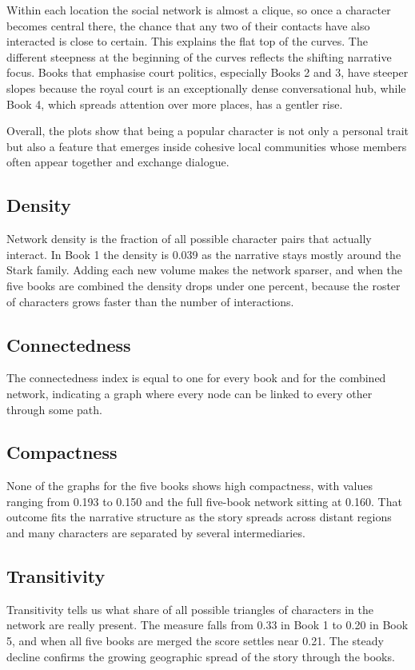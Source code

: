 \documentclass[12pt, a4paper]{article}
\begin{document}
 Within each location the social network is almost a clique, 
 so once a character becomes central there, the chance that any 
 two of their contacts have also interacted is close to certain. 
 This explains the flat top of the curves.
   The different steepness at the beginning of the curves reflects the shifting narrative focus.
   Books that emphasise court politics, especially Books 2 and 3, 
   have steeper slopes because the royal court is an exceptionally 
   dense conversational hub, while Book 4, which spreads attention over more places, 
   has a gentler rise. 
   
   Overall, the plots show that being a popular character is not only a personal trait but also a feature that emerges inside cohesive local communities whose members often appear together and exchange dialogue.

\subsection*{Density}
Network density is the fraction of all possible character pairs that actually interact. In Book 1 the density is 0.039 as the narrative stays mostly around the Stark family. Adding each new volume makes the network sparser, and when the five books are combined the density drops under one percent, because the roster of characters grows faster than the number of interactions.

\subsection*{Connectedness}
The connectedness index is equal to one for every book and for the combined network, indicating a graph where every node can be linked to every other through some path. 

\subsection*{Compactness}
None of the graphs for the five books shows high compactness, with values ranging from 0.193 to 0.150 and the full five-book network sitting at 0.160. That outcome fits the narrative structure as the story spreads across distant regions and many characters are separated by several intermediaries. 

\subsection*{Transitivity}
Transitivity tells us what share of all possible triangles of characters in the network are really present. The measure falls from 0.33 in Book 1 to 0.20 in Book 5, and when all five books are merged the score settles near 0.21. The steady decline confirms the growing geographic spread of the story through the books. 
\end{document}
